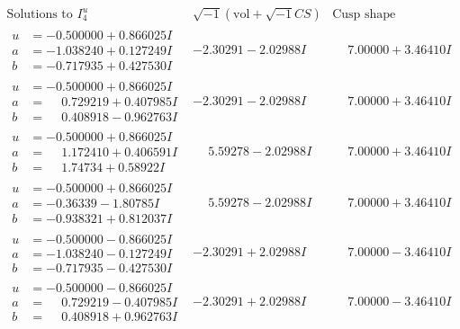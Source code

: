 \documentclass[1p]{elsarticle_modified}
\theoremstyle{definition}
\newcommand{\I}{\sqrt{-1}}
\begin{document}
$$\begin{array}{c|c|c}  
\text{Solutions to }I^u_{4}& \I (\text{vol} + \sqrt{-1}CS) & \text{Cusp shape}\\
 \hline 
\begin{aligned}
u &= -0.500000 + 0.866025 I \\
a &= -1.038240 + 0.127249 I \\
b &= -0.717935 + 0.427530 I\end{aligned}
 & -2.30291 - 2.02988 I & \phantom{-}7.00000 + 3.46410 I \\ \hline\begin{aligned}
u &= -0.500000 + 0.866025 I \\
a &= \phantom{-}0.729219 + 0.407985 I \\
b &= \phantom{-}0.408918 - 0.962763 I\end{aligned}
 & -2.30291 - 2.02988 I & \phantom{-}7.00000 + 3.46410 I \\ \hline\begin{aligned}
u &= -0.500000 + 0.866025 I \\
a &= \phantom{-}1.172410 + 0.406591 I \\
b &= \phantom{-}1.74734 + 0.58922 I\end{aligned}
 & \phantom{-}5.59278 - 2.02988 I & \phantom{-}7.00000 + 3.46410 I \\ \hline\begin{aligned}
u &= -0.500000 + 0.866025 I \\
a &= -0.36339 - 1.80785 I \\
b &= -0.938321 + 0.812037 I\end{aligned}
 & \phantom{-}5.59278 - 2.02988 I & \phantom{-}7.00000 + 3.46410 I \\ \hline\begin{aligned}
u &= -0.500000 - 0.866025 I \\
a &= -1.038240 - 0.127249 I \\
b &= -0.717935 - 0.427530 I\end{aligned}
 & -2.30291 + 2.02988 I & \phantom{-}7.00000 - 3.46410 I \\ \hline\begin{aligned}
u &= -0.500000 - 0.866025 I \\
a &= \phantom{-}0.729219 - 0.407985 I \\
b &= \phantom{-}0.408918 + 0.962763 I\end{aligned}
 & -2.30291 + 2.02988 I & \phantom{-}7.00000 - 3.46410 I \\ \hline\begin{aligned}

\end{aligned}
\end{array}$$
\end{document}
